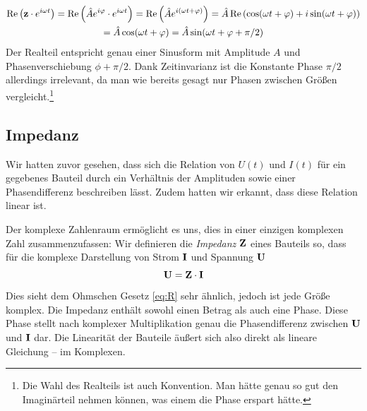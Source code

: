 \begin{gather*}
    \Re\qty(\mathbf{z}\cdot e^{i\omega t})
    = \Re\qty(\hat Ae^{i\varphi} \cdot e^{i\omega t})
    = \Re\qty(\hat Ae^{i(\omega t + \varphi)})
    = \hat A\Re\qty(\cos(\omega t + \varphi) + i\sin(\omega t + \varphi)) \\
    = \hat A\cos(\omega t  +\varphi)
    = \hat A\sin(\omega t + \varphi + \pi/2)
\end{gather*}
Der Realteil entspricht genau einer Sinusform mit Amplitude $A$ und Phasenverschiebung $\phi+\pi/2$. Dank Zeitinvarianz
ist die Konstante Phase $\pi/2$ allerdings irrelevant, da man wie bereits gesagt nur Phasen zwischen Größen
vergleicht.\footnote{Die Wahl des Realteils ist auch Konvention. Man hätte genau so gut den Imaginärteil nehmen können,
was einem die Phase erspart hätte.}
\subsection{Impedanz}
Wir hatten zuvor gesehen, dass sich die Relation von $U(t)$ und $I(t)$ für ein gegebenes Bauteil durch ein Verhältnis
der Amplituden sowie einer Phasendifferenz beschreiben lässt. Zudem hatten wir erkannt, dass diese Relation linear ist.

Der komplexe Zahlenraum ermöglicht es uns, dies in einer einzigen komplexen Zahl zusammenzufassen: Wir definieren die
\emph{Impedanz} $\mathbf{Z}$ eines Bauteils so, dass für die komplexe Darstellung von Strom $\mathbf{I}$ und Spannung $\mathbf{U}$
\begin{equation}\label{eq:impedanz}
    \mathbf{U} = \mathbf{Z} \cdot \mathbf{I}
\end{equation}
Dies sieht dem Ohmschen Gesetz \eqref{eq:R} sehr ähnlich, jedoch ist jede Größe komplex. Die Impedanz enthält sowohl
einen Betrag als auch eine Phase. Diese Phase stellt nach komplexer Multiplikation genau die Phasendifferenz zwischen
$\mathbf{U}$ und $\mathbf{I}$ dar. Die Linearität der Bauteile äußert sich also direkt als lineare Gleichung -- im Komplexen.

